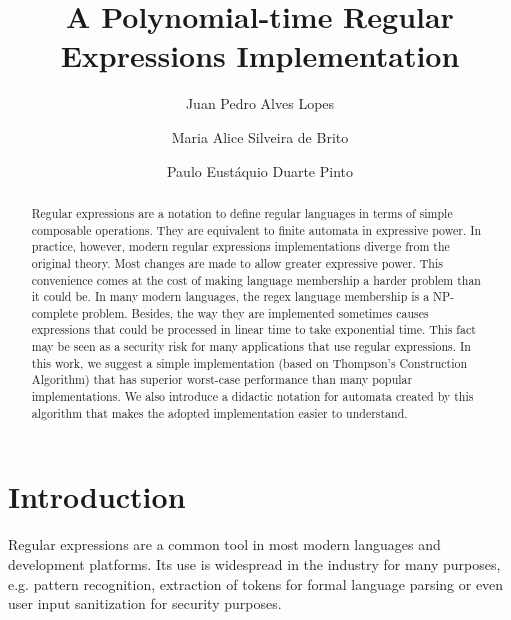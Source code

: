 \documentclass{llncs}
\begin{document}
\title{A Polynomial-time Regular Expressions Implementation}

\author{Juan Pedro Alves Lopes \and Maria Alice Silveira de Brito \and Paulo Eustáquio Duarte Pinto}




\maketitle

\begin{abstract}

Regular expressions are a notation to define regular languages in terms of simple composable operations. They are equivalent to finite automata in expressive power. In practice, however, modern regular expressions implementations diverge from the original theory. Most changes are made to allow greater expressive power. This convenience comes at the cost of making language membership a harder problem than it could be. In many modern languages, the regex language membership is a NP-complete problem. Besides, the way they are implemented sometimes causes expressions that could be processed in linear time to take exponential time. This fact may be seen as a security risk for many applications that use regular expressions. In this work, we suggest a simple implementation (based on Thompson's Construction Algorithm) that has superior worst-case performance than many popular implementations. We also introduce a didactic notation for automata created by this algorithm that makes the adopted implementation easier to understand.

\end{abstract}

\section{Introduction}

Regular expressions are a common tool in most modern languages and development platforms. Its use is widespread in the industry for many purposes, e.g. pattern recognition, extraction of tokens for formal language parsing or even user input sanitization for security purposes.
\end{document}
